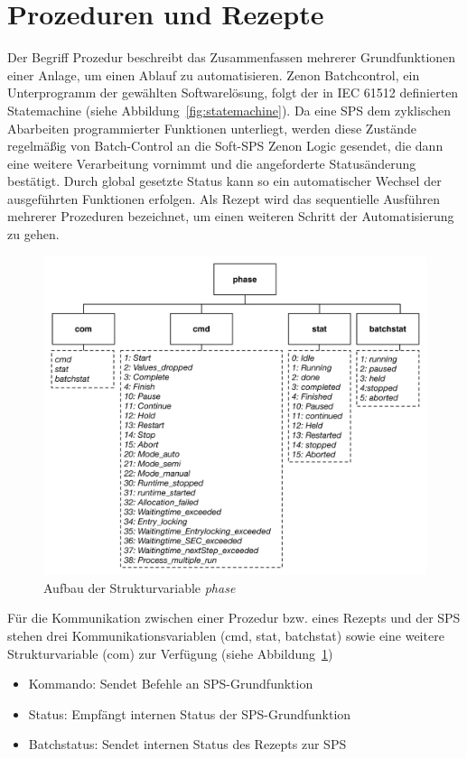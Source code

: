 	\section{Prozeduren und Rezepte}
	Der Begriff Prozedur beschreibt das Zusammenfassen mehrerer Grundfunktionen einer Anlage, um einen Ablauf zu automatisieren. Zenon Batchcontrol, ein Unterprogramm der gewählten Softwarelösung, folgt der in IEC 61512 definierten Statemachine (siehe Abbildung~\ref{fig:statemachine}). Da eine SPS dem zyklischen Abarbeiten programmierter Funktionen unterliegt, werden diese Zustände regelmäßig von Batch-Control an die Soft-SPS Zenon Logic gesendet, die dann eine weitere Verarbeitung vornimmt und die angeforderte Statusänderung bestätigt. Durch global gesetzte Status kann so ein automatischer Wechsel der ausgeführten Funktionen erfolgen. Als Rezept wird das sequentielle Ausführen mehrerer Prozeduren bezeichnet, um einen weiteren Schritt der Automatisierung zu gehen.\\

\begin{figure}[h!]
  \centering
  \includegraphics[height=0.6\textwidth]{graphics/implementation/Datentyp_Phase.jpg}
  \caption{Aufbau der Strukturvariable \glqq \textit{phase}\grqq}
  \label{fig:var_phase}
\end{figure}
	
	Für die Kommunikation zwischen einer Prozedur bzw. eines Rezepts und der SPS stehen drei Kommunikationsvariablen (cmd, stat, batchstat) sowie eine weitere Strukturvariable (com) zur Verfügung (siehe Abbildung~\ref{fig:var_phase})
	
	\begin{itemize}
		\item Kommando: Sendet Befehle an SPS-Grundfunktion
		\item Status: Empfängt internen Status der SPS-Grundfunktion
		\item Batchstatus: Sendet internen Status des Rezepts zur SPS
	\end{itemize}

